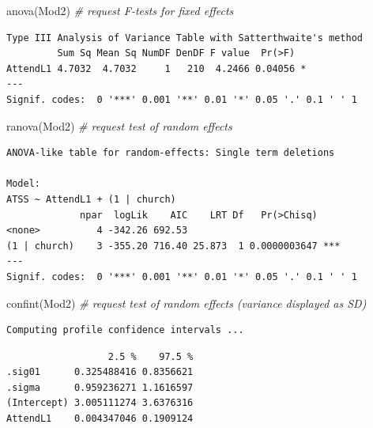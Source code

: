 \documentclass[
  english,
]{book}
\newenvironment{Shaded}{\begin{snugshade}}{\end{snugshade}}
\newcommand{\CommentTok}[1]{\textcolor[rgb]{0.56,0.35,0.01}{\textit{#1}}}
\newcommand{\FunctionTok}[1]{\textcolor[rgb]{0.00,0.00,0.00}{#1}}
\newcommand{\NormalTok}[1]{#1}
\begin{document}
\begin{Shaded}
\begin{Highlighting}[]
\FunctionTok{anova}\NormalTok{(Mod2) }\CommentTok{\# request F{-}tests for fixed effects}
\end{Highlighting}
\end{Shaded}

\begin{verbatim}
Type III Analysis of Variance Table with Satterthwaite's method
         Sum Sq Mean Sq NumDF DenDF F value  Pr(>F)  
AttendL1 4.7032  4.7032     1   210  4.2466 0.04056 *
---
Signif. codes:  0 '***' 0.001 '**' 0.01 '*' 0.05 '.' 0.1 ' ' 1
\end{verbatim}

\begin{Shaded}
\begin{Highlighting}[]
\FunctionTok{ranova}\NormalTok{(Mod2) }\CommentTok{\# request test of random effects}
\end{Highlighting}
\end{Shaded}

\begin{verbatim}
ANOVA-like table for random-effects: Single term deletions

Model:
ATSS ~ AttendL1 + (1 | church)
             npar  logLik    AIC    LRT Df   Pr(>Chisq)    
<none>          4 -342.26 692.53                           
(1 | church)    3 -355.20 716.40 25.873  1 0.0000003647 ***
---
Signif. codes:  0 '***' 0.001 '**' 0.01 '*' 0.05 '.' 0.1 ' ' 1
\end{verbatim}

\begin{Shaded}
\begin{Highlighting}[]
\FunctionTok{confint}\NormalTok{(Mod2) }\CommentTok{\# request test of random effects (variance displayed as SD)}
\end{Highlighting}
\end{Shaded}

\begin{verbatim}
Computing profile confidence intervals ...
\end{verbatim}

\begin{verbatim}
                  2.5 %    97.5 %
.sig01      0.325488416 0.8356621
.sigma      0.959236271 1.1616597
(Intercept) 3.005111274 3.6376316
AttendL1    0.004347046 0.1909124
\end{verbatim}
\end{document}
